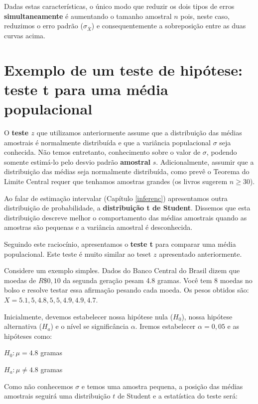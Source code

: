 \documentclass[
]{book}
\begin{document}
Dadas estas características, o único modo que reduzir os dois tipos de erros \textbf{simultaneamente} é aumentando o tamanho amostral \(n\) pois, neste caso, reduzimos o erro padrão (\(\sigma_{\overline{X}}\)) e consequentemente a sobreposição entre as duas curvas acima.

\hypertarget{exemplo-de-um-teste-de-hipuxf3tese-teste-t-para-uma-muxe9dia-populacional}{%
\section{Exemplo de um teste de hipótese: teste t para uma média populacional}\label{exemplo-de-um-teste-de-hipuxf3tese-teste-t-para-uma-muxe9dia-populacional}}

O \textbf{teste \(z\)} que utilizamos anteriormente assume que a distribuição das médias amostrais é normalmente distribuída e que a variância populacional \(\sigma\) seja conhecida. Não temos entretanto, conhecimento sobre o valor de \(\sigma\), podendo somente estimá-lo pelo desvio padrão \textbf{amostral} \(s\). Adicionalmente, assumir que a distribuição das médias seja normalmente distribuída, como prevê o Teorema do Limite Central requer que tenhamos amostras grandes (os livros sugerem \(n \ge 30\)).

Ao falar de estimação intervalar (Capítulo \ref{inferenc}) apresentamos outra distribuição de probabilidade, a \textbf{distribuição t de Student}. Dissemos que esta distribuição descreve melhor o comportamento das médias amostrais quando as amostras são pequenas e a variância amostral é desconhecida.

Seguindo este raciocínio, apresentamos o \textbf{teste t} para comparar uma média populacional. Este teste é muito similar ao teset \(z\) apresentado anteriormente.

Considere um exemplo simples. Dados do Banco Central do Brasil dizem que moedas de \(R\$ 0,10\) da segunda geração pesam 4.8 gramas. Você tem \(8\) moedas no bolso e resolve testar essa afirmação pesando cada moeda. Os pesos obtidos são: \(X = 5.1, 5, 4.8, 5, 5, 4.9, 4.9, 4.7\).

Inicialmente, devemos estabelecer nossa hipótese nula (\(H_0\)), nossa hipótese alternativa (\(H_a\)) e o nível se significância \(\alpha\). Iremos estabelecer \(\alpha = 0,05\) e as hipóteses como:

\(H_0: \mu = 4.8\) gramas

\(H_a: \mu \ne 4.8\) gramas

Como não conhecemos \(\sigma\) e temos uma amostra pequena, a posição das médias amostrais seguirá uma distribuição \(t\) de Student e a estatística do teste será:
\end{document}
